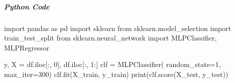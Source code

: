 \subparagraph{Python Code}
\begin{python}
import pandas as pd
import sklearn
from sklearn.model_selection import train_test_split
from sklearn.neural_network import MLPClassifier,
    MLPRegressor

y, X = df.iloc[:, 0], df.iloc[:, 1:]
clf = MLPClassifier(
   random_state=1,
   max_iter=300)
clf.fit(X_train, y_train)
print(clf.score(X_test, y_test))
\end{python}

